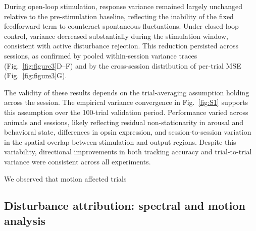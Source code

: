  During open-loop stimulation, response variance remained largely unchanged relative to the pre-stimulation baseline, reflecting the inability of the fixed feedforward term to counteract spontaneous fluctuations. Under closed-loop control, variance decreased substantially during the stimulation window, consistent with active disturbance rejection. This reduction persisted across sessions, as confirmed by pooled within-session variance traces (Fig.~\ref{fig:figure3}D--F) and by the cross-session distribution of per-trial MSE (Fig.~\ref{fig:figure3}G).

The validity of these results depends on the trial-averaging assumption holding across the session. The empirical variance convergence in Fig.~\ref{fig:S1} supports this assumption over the 100-trial validation period. 
Performance varied across animals and sessions, likely reflecting residual non-stationarity in arousal and behavioral state, differences in opsin expression, and session-to-session variation in the spatial overlap between stimulation and output regions.
Despite this variability, directional improvements in both tracking accuracy and trial-to-trial variance were consistent across all experiments.


We observed that motion affected trials 

\subsection*{Disturbance attribution: spectral and motion analysis}

